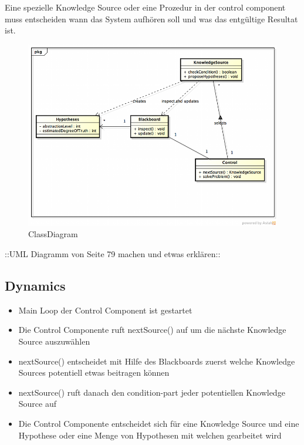 Eine spezielle Knowledge Source oder eine Prozedur in der control component muss entscheiden wann das System aufhören soll und was das entgültige Resultat ist.


\begin{figure}[H]
	\centering
	\includegraphics[width=\textwidth]{content/posa1/images/blackboard-class.png}
	\caption{ClassDiagram}
\end{figure}

::UML Diagramm von Seite 79 machen und etwas erklären::

\subsection*{Dynamics}


\begin{itemize}
	\item Main Loop der Control Component ist gestartet
	\item Die Control Componente ruft nextSource() auf um die nächste Knowledge Source auszuwählen
	\item nextSource() entscheidet mit Hilfe des Blackboards zuerst welche Knowledge Sources potentiell etwas beitragen können
	\item nextSource() ruft danach den condition-part jeder potentiellen Knowledge Source auf
	\item Die Control Componente entscheidet sich für eine Knowledge Source und eine Hypothese oder eine Menge von Hypothesen mit welchen gearbeitet wird
\end{itemize}

